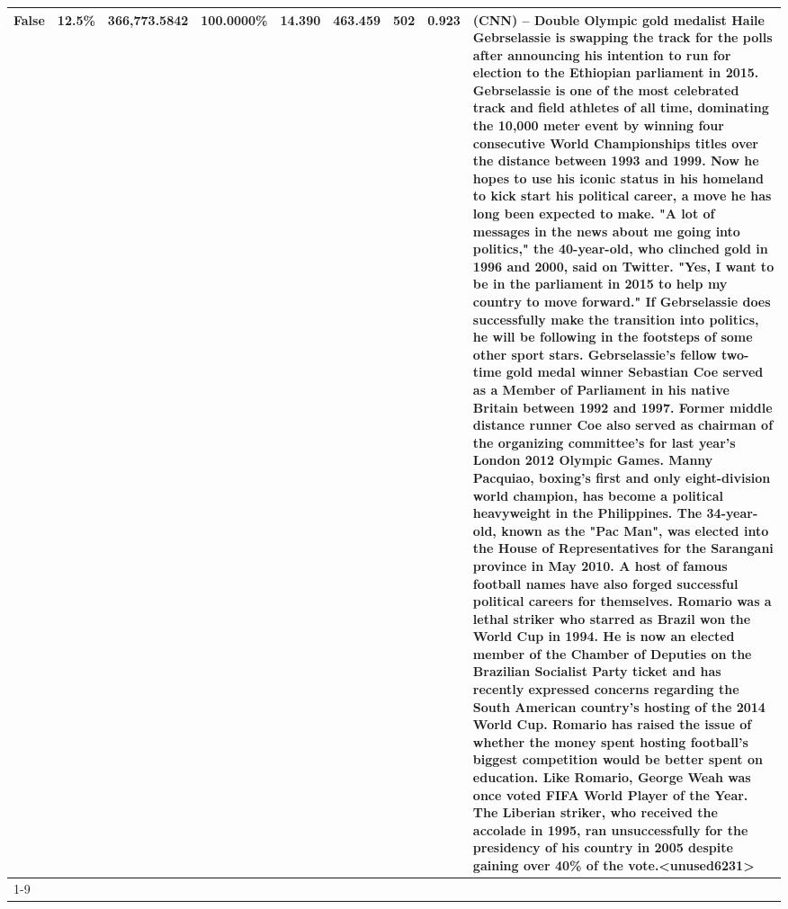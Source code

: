 \begin{table}[H]
{\begin{tabular}{lllrlllll}
False & 12.5\% & 366,773.5842 & \bfseries \color{red} 100.0000\% & 14.390 & 463.459 & 502 & 0.923 & (CNN) -- Double Olympic gold medalist Haile Gebrselassie is swapping the track for the polls after announcing his intention to run for election to the Ethiopian parliament in 2015. Gebrselassie is one of the most celebrated track and field athletes of all time, dominating the 10,000 meter event by winning four consecutive World Championships titles over the distance between 1993 and 1999. Now he hopes to use his iconic status in his homeland to kick start his political career, a move he has long been expected to make. "A lot of messages in the news about me going into politics," the 40-year-old, who clinched gold in 1996 and 2000, said on Twitter. "Yes, I want to be in the parliament in 2015 to help my country to move forward." If Gebrselassie does successfully make the transition into politics, he will be following in the footsteps of some other sport stars. Gebrselassie's fellow two-time gold medal winner Sebastian Coe served as a Member of Parliament in his native Britain between 1992 and 1997. Former middle distance runner Coe also served as chairman of the organizing committee's for last year's London 2012 Olympic Games. Manny Pacquiao, boxing's first and only eight-division world champion, has become a political heavyweight in the Philippines. The 34-year-old, known as the "Pac Man", was elected into the House of Representatives for the Sarangani province in May 2010. A host of famous football names have also forged successful political careers for themselves. Romario was a lethal striker who starred as Brazil won the World Cup in 1994. He is now an elected member of the Chamber of Deputies on the Brazilian Socialist Party ticket and has recently expressed concerns regarding the South American country's hosting of the 2014 World Cup. Romario has raised the issue of whether the money spent hosting football's biggest competition would be better spent on education. Like Romario, George Weah was once voted FIFA World Player of the Year. The Liberian striker, who received the accolade in 1995, ran unsuccessfully for the presidency of his country in 2005 despite gaining over 40\% of the vote.<unused6231> \\
\cline{1-9}

\end{tabular}}
\end{table}
